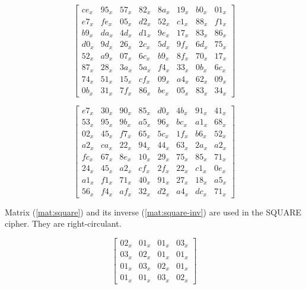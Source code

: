 \documentclass{report}
\begin{document}
\begin{equation}\label{mat:shark}
\begin{bmatrix}
ce_x & 95_x & 57_x & 82_x & 8a_x & 19_x & b0_x & 01_x\\
e7_x & fe_x & 05_x & d2_x & 52_x & c1_x & 88_x & f1_x\\
b9_x & da_x & 4d_x & d1_x & 9e_x & 17_x & 83_x & 86_x\\
d0_x & 9d_x & 26_x & 2c_x & 5d_x & 9f_x & 6d_x & 75_x\\
52_x & a9_x & 07_x & 6c_x & b9_x & 8f_x & 70_x & 17_x\\
87_x & 28_x & 3a_x & 5a_x & f4_x & 33_x & 0b_x & 6c_x\\
74_x & 51_x & 15_x & cf_x & 09_x & a4_x & 62_x & 09_x\\
0b_x & 31_x & 7f_x & 86_x & be_x & 05_x & 83_x & 34_x
\end{bmatrix}
\end{equation}

\begin{equation}\label{mat:shark-inv}
\begin{bmatrix}
e7_x &30_x &90_x &85_x &d0_x &4b_x &91_x &41_x\\
53_x &95_x &9b_x &a5_x &96_x &bc_x &a1_x &68_x\\
02_x &45_x &f7_x &65_x &5c_x &1f_x &b6_x &52_x\\
a2_x &ca_x &22_x &94_x &44_x &63_x &2a_x &a2_x\\
fc_x &67_x &8e_x &10_x &29_x &75_x &85_x &71_x\\
24_x &45_x &a2_x &cf_x &2f_x &22_x &c1_x &0e_x\\
a1_x &f1_x &71_x &40_x &91_x &27_x &18_x &a5_x\\
56_x &f4_x &af_x &32_x &d2_x &a4_x &dc_x &71_x
\end{bmatrix}
\end{equation}

Matrix (\ref{mat:square}) and its inverse (\ref{mat:square-inv}) are used in the SQUARE \cite{SQUARE1997} cipher. They are right-circulant.

\begin{equation}\label{mat:square}
\begin{bmatrix}
02_x & 01_x & 01_x & 03_x\\
03_x & 02_x & 01_x & 01_x\\
01_x & 03_x & 02_x & 01_x\\
01_x & 01_x & 03_x & 02_x
\end{bmatrix}
\end{equation}
\end{document}
